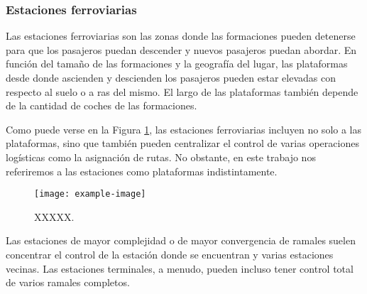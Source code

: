 \subsubsection{Estaciones ferroviarias}

Las estaciones ferroviarias son las zonas donde las formaciones pueden detenerse para que los pasajeros puedan descender y nuevos pasajeros puedan abordar. En función del tamaño de las formaciones y la geografía del lugar, las plataformas desde donde ascienden y descienden los pasajeros pueden estar elevadas con respecto al suelo o a ras del mismo. El largo de las plataformas también depende de la cantidad de coches de las formaciones.

Como puede verse en la Figura \ref{fig:estacion_1}, las estaciones ferroviarias incluyen no solo a las plataformas, sino que también pueden centralizar el control de varias operaciones logísticas como la asignación de rutas. No obstante, en este trabajo nos referiremos a las estaciones como plataformas indistintamente.

    \begin{figure}[h]
        \centering
        \texttt{[image: example-image]}
        \centering\caption{XXXXX.}
        \label{fig:estacion_1}
    \end{figure}

Las estaciones de mayor complejidad o de mayor convergencia de ramales suelen concentrar el control de la estación donde se encuentran y varias estaciones vecinas. Las estaciones terminales, a menudo, pueden incluso tener control total de varios ramales completos.
